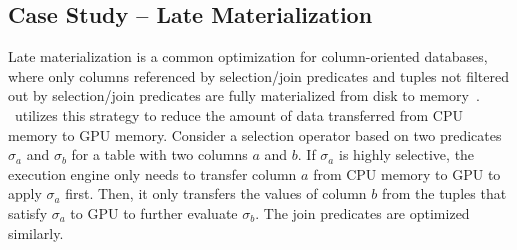 \subsection{Case Study -- Late Materialization}
\label{sec:design-ssb}
Late materialization is a common optimization for column-oriented databases, where only columns referenced by selection/join predicates and tuples not filtered out by selection/join predicates are fully materialized from disk to memory~\cite{abadi2006materialization}. 
\THISWORK~utilizes this strategy to reduce the amount of data transferred from CPU memory to GPU memory. Consider a selection operator based on two predicates $\sigma_a$ and $\sigma_b$ for a table with two columns $a$ and $b$.
If $\sigma_a$ is highly selective, the execution engine only needs to transfer column $a$ from CPU memory to GPU to apply $\sigma_a$ first. Then, it only transfers the values of column $b$ from the tuples that satisfy $\sigma_a$ to GPU to further evaluate $\sigma_b$. 
The join predicates are optimized similarly.


